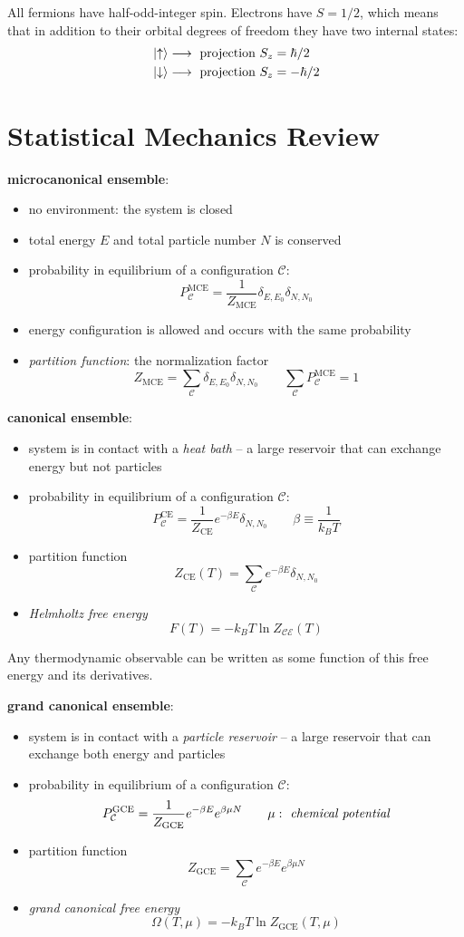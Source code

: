 \documentclass[10pt, a4paper, twocolumn]{article}
\newenvironment{definition}[1]{\par \noindent \textbf{#1}: \begin{itemize} \renewcommand{\labelitemi}{$\hookrightarrow$}}{\end{itemize}}
\newcommand{\bd}{\begin{definition}}
\newcommand{\ed}{\end{definition}}
\newcommand{\deff}[1]{\par \noindent \textit{#1}: }
\newcommand{\arr}{\ensuremath{\longrightarrow\ }}
\begin{document}
All fermions have half-odd-integer spin. Electrons have $S = 1/2$, which means that in addition to their orbital degrees of freedom they have two internal states:
\begin{equation*}
\begin{aligned}
&\ket{\uparrow} \arr \text{projection } S_z = \hbar /2
\\ &\ket{\downarrow} \arr \text{projection } S_z = - \hbar /2
\end{aligned}
\end{equation*}

\section{Statistical Mechanics Review}

\bd{microcanonical ensemble}
\item no environment: the system is closed
\item total energy $E$ and total particle number $N$ is conserved
\item probability in equilibrium of a configuration $\mathcal C$:
\[ P _\mathcal C ^\text{MCE} = \frac{1}{Z_\text{MCE}}
\delta _{E,E_0} \delta _{N,N_0} \]
\item energy configuration is allowed and occurs with the same probability
\item \deff{partition function} the normalization factor
\[ Z_\text{MCE}
= \sum _\mathcal C \delta _{E,E_0} \delta _{N,N_0}
\qquad \sum _\mathcal C P_\mathcal C ^\mathrm{MCE} = 1 \]
\ed

\bd{canonical ensemble}
\item system is in contact with a \emph{heat bath}
-- a large reservoir that can exchange energy but not particles
\item probability in equilibrium of a configuration $\mathcal C$:
\[ P _\mathcal C ^\mathrm{CE} = \frac{1}{Z_\mathrm{CE}}
e^{-\beta E} \delta _{N,N_0}
\qquad \beta \equiv \frac{1}{k_B T} \]
\item partition function
\[ Z_\mathrm{CE} (T) = \sum _\mathcal C e^{-\beta E}
\delta _{N,N_0} \]
\item \emph{Helmholtz free energy}
\[ F(T) = -k_B T \ln Z_\mathcal{CE} (T) \]
\ed

Any thermodynamic observable can be written as some function of this free energy and its derivatives.

\bd{grand canonical ensemble}
\item system is in contact with a \emph{particle reservoir} -- a large reservoir that can exchange both energy and particles
\item probability in equilibrium of a configuration $\mathcal C$:
\[ P_\mathcal C^\mathrm{GCE} = \frac{1}{Z_\mathrm{GCE}}
e^{- \beta E} e^{\beta \mu N}
\qquad \mu: \text{\emph{ chemical potential}}
\]
\item partition function
\[ Z_\mathrm{GCE} = \sum _\mathcal C e^{-\beta E}
e^{\beta \mu N} \]
\item \emph{grand canonical free energy}
\[ \Omega (T, \mu) = - k _B T \ln Z_\mathrm{GCE} (T, \mu)\]
\ed
\end{document}
